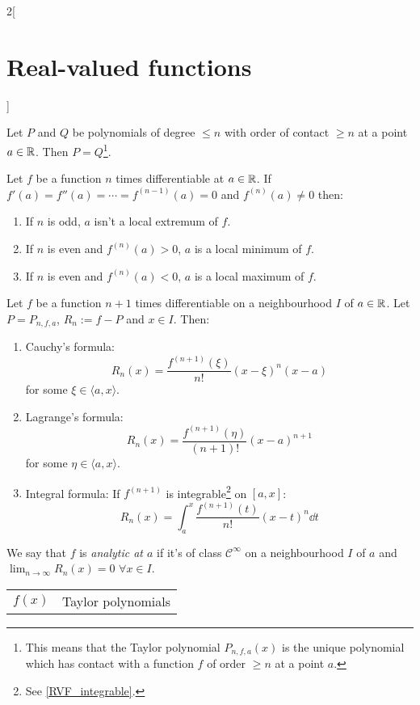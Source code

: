 \documentclass[../../../main.tex]{subfiles}
\begin{document}
\begin{multicols}{2}[\section{Real-valued functions}]
\begin{theorem}
  \end{theorem}
  \begin{proposition}
    Let $P$ and $Q$ be polynomials of degree $\leq n$ with order of contact $\geq n$ at a point $a\in\mathbb{R}$. Then $P=Q$\footnote{This means that the Taylor polynomial $P_{n,f,a}(x)$ is the unique polynomial which has contact with a function $f$ of order $\geq n$ at a point $a$.}.
  \end{proposition}
  \begin{theorem}
    Let $f$ be a function $n$ times differentiable at $a\in\mathbb{R}$. If $f'(a)=f''(a)=\cdots=f^{(n-1)}(a)=0$ and $f^{(n)}(a)\ne 0$ then:
    \begin{enumerate}
      \item If $n$ is odd, $a$ isn't a local extremum of $f$.
      \item If $n$ is even and $f^{(n)}(a)>0$, $a$ is a local minimum of $f$.
      \item If $n$ is even and $f^{(n)}(a)<0$, $a$ is a local maximum of $f$.
    \end{enumerate}
  \end{theorem}
  \begin{theorem}
    Let $f$ be a function $n+1$ times differentiable on a neighbourhood $I$ of $a\in\mathbb{R}$. Let $P=P_{n,f,a}$, $R_n:=f-P$ and $x\in I$. Then:
    \begin{enumerate}
      \item Cauchy's formula: $$R_n(x)=\frac{f^{(n+1)}(\xi)}{n!}{(x-\xi)}^n(x-a)$$ for some $\xi\in\langle a,x\rangle$.
      \item Lagrange's formula: $$R_n(x)=\frac{f^{(n+1)}(\eta)}{(n+1)!}{(x-a)}^{n+1}$$ for some $\eta\in\langle a,x\rangle$.
      \item Integral formula: If $f^{(n+1)}$ is integrable\footnote{See \cref{RVF_integrable}.} on $[a,x]$: $$R_n(x)=\int_a^x\frac{f^{(n+1)}(t)}{n!}{(x-t)}^n\dd{t}$$
    \end{enumerate}
  \end{theorem}
  \begin{definition}
    We say that $f$ is \emph{analytic at $a$} if it's of class $\mathcal{C}^\infty$ on a neighbourhood $I$ of $a$ and $\displaystyle\lim_{n\to\infty}R_n(x)=0$  $\forall x\in I$.
  \end{definition}
  \begin{center}
    \renewcommand*{\arraystretch}{2}
    \begin{tabular}{|c|>{\centering\arraybackslash}m{6.5cm}|}
      \hline
      $f(x)$                       & Taylor polynomials                                                                                     \\

\end{tabular}
\end{center}
\end{multicols}
\end{document}
